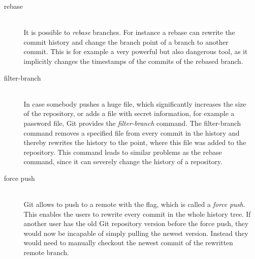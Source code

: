 \begin{description}
    \item[rebase] \hfill \\
        It is possible to \emph{rebase} branches. For instance a rebase can rewrite the commit history and change the branch point of a branch to another commit.
        This is for example a very powerful but also dangerous tool, as it implicitly changes the timestamps of the commits of the rebased branch.

    \item[filter-branch] \hfill \\
        In case somebody pushes a huge file, which significantly increases the size of the repository, or adds a file with secret information, for example a password file, Git provides the \emph{filter-branch} command.
        The filter-branch command removes a specified file from every commit in the history and thereby rewrites the history to the point, where this file was added to the repository.
        This command leads to similar problems as the rebase command, since it can severely change the history of a repository.

    \item[force push] \hfill \\
        Git allows to push to a remote with the  flag, which is called a \emph{force push}.
        This enables the users to rewrite every commit in the whole history tree.
        If another user has the old Git repository version before the force push, they would now be incapable of simply pulling the newest version.
        Instead they would need to manually checkout the newest commit of the rewritten remote branch.

\end{description}
